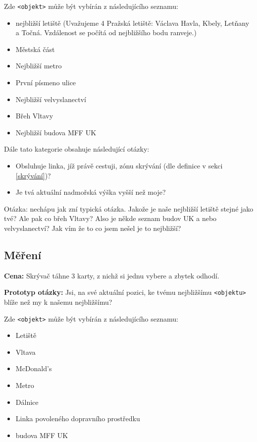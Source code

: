 Zde \verb|<objekt>| může být vybírán z následujícího seznamu:

\begin{itemize}
	\item nejbližší letiště (Uvažujeme 4 Pražská letiště: Václava Havla, Kbely, Letňany a Točná. Vzdálenost se počítá od nejbližšího bodu ranveje.)
	\item Městská část
	\item Nejbližší metro
	\item První písmeno ulice
	\item Nejbližší velvyslanectví
	\item Břeh Vltavy
	\item Nejbližší budova MFF UK
\end{itemize}

Dále tato kategorie obsahuje následující otázky:

\begin{itemize}
	\item Obsluhuje linka, jíž právě cestuji, zónu skrývání (dle definice v sekci \ref{skrývání})?
	\item Je tvá aktuální nadmořská výška vyšší než moje?
\end{itemize}
Otázka: nechápu jak zní typická otázka. Jakože je naše nejbližší letiště stejné jako tvé? Ale pak co břeh Vltavy?
Also je někde seznam budov UK a nebo velvyslanectví? Jak vím že to co jsem nešel je to nejbližší?


\subsection{Měření}

\textbf{Cena:} Skrývač táhne 3 karty, z nichž si jednu vybere a zbytek odhodí.

\textbf{Prototyp otázky:} Jsi, na své aktuální pozici, ke tvému nejbližšímu \verb|<objektu>| blíže než my k našemu nejbližšímu?

Zde \verb|<objekt>| může být vybírán z následujícího seznamu:

\begin{itemize}
	\item Letiště
	\item Vltava
	\item McDonald's
	\item Metro
	\item Dálnice
	\item Linka povoleného dopravního prostředku
	\item budova MFF UK
\end{itemize}

